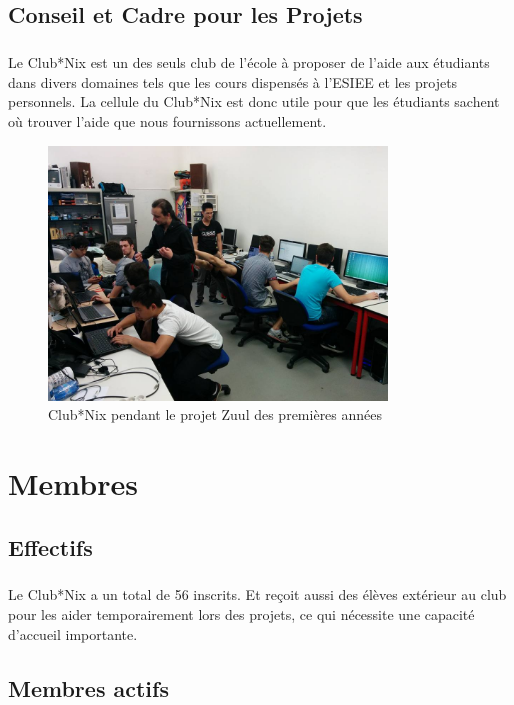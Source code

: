 \documentclass[11pt]{report}
\begin{document}
\section{Conseil et Cadre pour les Projets}

\paragraph{} Le Club*Nix est un des seuls club de l'école à proposer de l'aide
aux étudiants dans divers domaines tels que les cours dispensés à l'ESIEE et
les projets personnels. La cellule du Club*Nix est donc utile pour que les
étudiants sachent où trouver l'aide que nous fournissons actuellement.

\begin{figure}[h!]
	\centering
	\includegraphics[width=90mm]{res/java-tutoring.jpg}
	\caption{Club*Nix pendant le projet Zuul des premières années}
\end{figure}

\chapter{Membres}

\section{Effectifs}

\paragraph{} Le Club*Nix a un total de 56 inscrits. Et reçoit aussi des élèves
extérieur au club pour les aider temporairement lors des projets, ce qui
nécessite une capacité d'accueil importante.

\section{Membres actifs}
\end{document}
